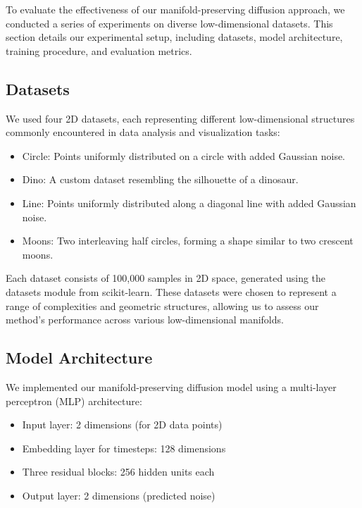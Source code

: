 \documentclass{article} %
\begin{document}
To evaluate the effectiveness of our manifold-preserving diffusion approach, we conducted a series of experiments on diverse low-dimensional datasets. This section details our experimental setup, including datasets, model architecture, training procedure, and evaluation metrics.

\subsection{Datasets}

We used four 2D datasets, each representing different low-dimensional structures commonly encountered in data analysis and visualization tasks:

\begin{itemize}
    \item Circle: Points uniformly distributed on a circle with added Gaussian noise.
    \item Dino: A custom dataset resembling the silhouette of a dinosaur.
    \item Line: Points uniformly distributed along a diagonal line with added Gaussian noise.
    \item Moons: Two interleaving half circles, forming a shape similar to two crescent moons.
\end{itemize}

Each dataset consists of 100,000 samples in 2D space, generated using the datasets module from scikit-learn. These datasets were chosen to represent a range of complexities and geometric structures, allowing us to assess our method's performance across various low-dimensional manifolds.

\subsection{Model Architecture}

We implemented our manifold-preserving diffusion model using a multi-layer perceptron (MLP) architecture:

\begin{itemize}
    \item Input layer: 2 dimensions (for 2D data points)
    \item Embedding layer for timesteps: 128 dimensions
    \item Three residual blocks: 256 hidden units each
    \item Output layer: 2 dimensions (predicted noise)
\end{itemize}
\end{document}

